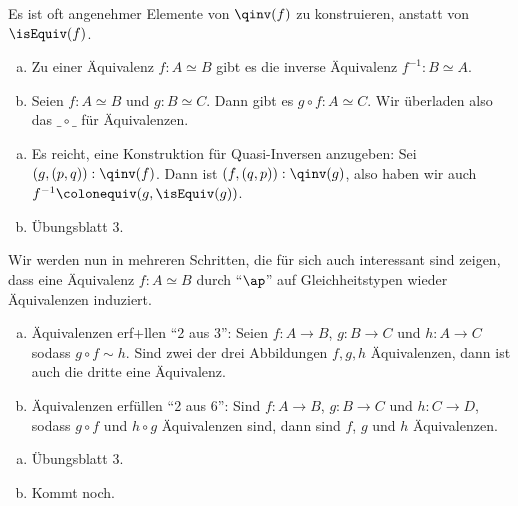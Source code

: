 Es ist oft angenehmer Elemente von $\qinv(f)$ zu konstruieren, anstatt von $\isEquiv(f)$.

\begin{lemma}
  \begin{enumerate}[(a)]
  \item Zu einer Äquivalenz $f:A\simeq B$ gibt es die inverse Äquivalenz $f^{-1}:B\simeq A$.
  \item Seien $f:A\simeq B$ und $g:B\simeq C$. Dann gibt es $g\circ f:A\simeq C$. Wir überladen also das $\_\circ\_$ für Äquivalenzen.
  \end{enumerate}
\end{lemma}

\begin{beweis}
  \begin{enumerate}[(a)]
  \item Es reicht, eine Konstruktion für Quasi-Inversen anzugeben: Sei $(g,(p,q)):\qinv(f)$.
    Dann ist $(f,(q,p)):\qinv(g)$, also haben wir auch $f^{-1}\colonequiv (g,\isEquiv(g))$.
  \item Übungsblatt 3.
  \end{enumerate}
\end{beweis}

Wir werden nun in mehreren Schritten, die für sich auch interessant sind zeigen,
dass eine Äquivalenz $f:A\simeq B$ durch ``$\ap$'' auf Gleichheitstypen wieder Äquivalenzen induziert.

\begin{lemma}
  \begin{enumerate}[(a)]
  \item Äquivalenzen erf+llen ``2 aus 3'':
    Seien $f:A\to B$, $g:B\to C$ und $h:A\to C$
    sodass $g\circ f\sim h$.
    Sind zwei der drei Abbildungen $f,g,h$ Äquivalenzen, dann ist auch die dritte eine Äquivalenz.
  \item Äquivalenzen erfüllen ``2 aus 6'':
    Sind $f:A\to B$, $g:B\to C$ und $h:C\to D$, sodass $g\circ f$ und $h\circ g$ Äquivalenzen sind,
    dann sind $f$, $g$ und $h$ Äquivalenzen.
  \end{enumerate}
\end{lemma}

\begin{beweis}
  \begin{enumerate}[(a)]
  \item Übungsblatt 3.
  \item Kommt noch.
  \end{enumerate}
\end{beweis}

